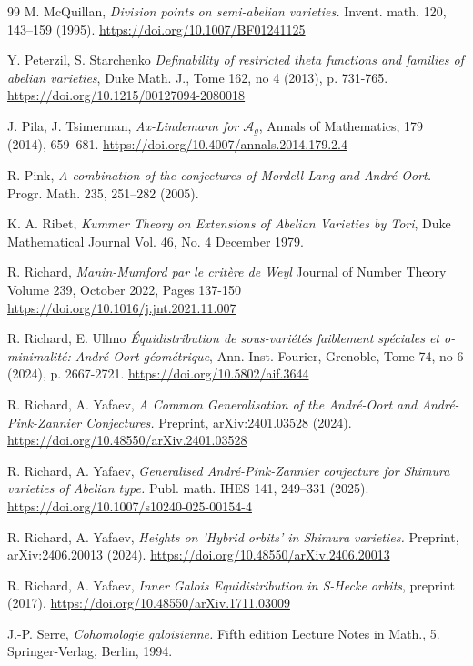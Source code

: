 \documentclass[12pt]{amsart}
\begin{document}
\begin{thebibliography}{99}
 M. McQuillan, {\it Division points on semi-abelian varieties.} Invent. math. 120, 143–159 (1995). \url{https://doi.org/10.1007/BF01241125}

 Y. Peterzil, S. Starchenko {\it Definability of restricted theta functions and families of abelian varieties}, Duke Math. J., Tome 162, no 4 (2013), p. 731-765.
\url{https://doi.org/10.1215/00127094-2080018}

 J. Pila, J. Tsimerman, {\it Ax-Lindemann for $\mathcal{A}_g$}, Annals of Mathematics, 179 (2014), 659–681. \url{https://doi.org/10.4007/annals.2014.179.2.4}



 R. Pink, {\it A combination of the conjectures of Mordell-Lang and André-Oort.} Progr. Math. 235, 251–282 (2005).

 K. A. Ribet, {\it Kummer Theory on Extensions of Abelian Varieties by Tori},
Duke Mathematical Journal Vol. 46, No. 4 December 1979.

 R. Richard,	
{\it Manin-Mumford par le critère de Weyl}
Journal of Number Theory
Volume 239, October 2022, Pages 137-150
\url{https://doi.org/10.1016/j.jnt.2021.11.007}

 R. Richard, E. Ullmo {\it Équidistribution de sous-variétés faiblement spéciales et
o-minimalité: André-Oort géométrique}, Ann. Inst. Fourier, Grenoble, Tome 74, no 6 (2024), p. 2667-2721.
\url{https://doi.org/10.5802/aif.3644}

 R. Richard, A. Yafaev, {\it A Common Generalisation of the André-Oort and André-Pink-Zannier Conjectures.} Preprint, arXiv:2401.03528 (2024). \url{https://doi.org/10.48550/arXiv.2401.03528}


 R. Richard, A. Yafaev, {\it Generalised André-Pink-Zannier conjecture for Shimura varieties of Abelian type.} Publ. math. IHES 141, 249–331 (2025). \url{https://doi.org/10.1007/s10240-025-00154-4}

 R. Richard, A. Yafaev, {\it Heights on 'Hybrid orbits' in Shimura varieties.} Preprint, arXiv:2406.20013 (2024). \url{https://doi.org/10.48550/arXiv.2406.20013}

 R. Richard, A. Yafaev, {\it Inner Galois Equidistribution in S-Hecke orbits}, preprint (2017). \url{https://doi.org/10.48550/arXiv.1711.03009}

   J.-P. Serre, {\it  Cohomologie galoisienne.} Fifth edition
Lecture Notes in Math., 5. Springer-Verlag, Berlin, 1994.


\end{thebibliography}
\end{document}
